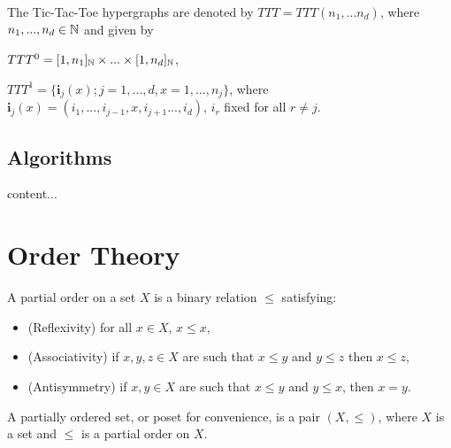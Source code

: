 \begin{exmp}
	The Tic-Tac-Toe hypergraphs are denoted by $TTT = TTT(n_1, ... n_d)$, where $n_1, ..., n_d \in \mathbb{N}$ and given by 
	
	\begin{center}
		$TTT^0 = [1, n_1]_{\mathbb{N}}\times...\times[1, n_d]_{\mathbb{N}}$,
		
		$TTT^1 = \{ \boldsymbol{i}_j(x); j=1, ..., d, x=1, ..., n_j \}$, where $\boldsymbol{i}_j(x)=(i_1, ..., i_{j-1}, x, i_{j+1} ..., i_d )$, $i_r$ fixed for all $r\neq j$.
	\end{center}
	
	\subsection{Algorithms}
	
	\begin{definition}
		content...
	\end{definition}
	
	
	
	
\end{exmp}















\section{Order Theory}

\begin{definition}
	A partial order on a set $X$ is a binary relation $\leq$ satisfying:
	
	\begin{itemize}
		\item (Reflexivity) for all $x \in X$, $x \leq x$,
		
		\item (Associativity) if $x, y, z \in X$ are such that $x \leq y$ and $y \leq z$ then $x \leq z$,
		
		\item (Antisymmetry) if $x, y \in X$ are such that $x\leq y$ and $y\leq x$, then $x=y$.
	\end{itemize}
	
	A partially ordered set, or poset for convenience, is a pair $(X, \leq)$, where $X$ is a set and $\leq$ is a partial order on $X$.
\end{definition}

